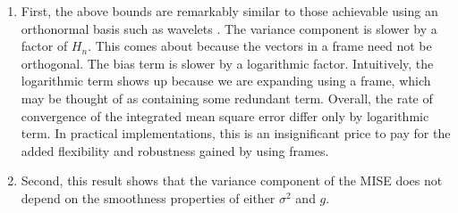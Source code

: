 \begin{remark}\mbox{}
  \begin{enumerate}  
    \item First, the above bounds are remarkably similar to those achievable using an orthonormal basis such as wavelets \citep{GenonCatalot1992}. The variance component is slower by a factor of $H_n$. This comes about because the vectors in a frame need not be orthogonal. The bias term is slower by a logarithmic factor. Intuitively, the logarithmic term shows up because we are expanding \sv using a frame, which may be thought of as containing some redundant term. Overall, the rate of convergence of the integrated mean square error differ only by logarithmic term. In practical implementations, this is an insignificant price to pay for the added flexibility and robustness gained by using frames. 
    \item Second, this result shows that the variance component of the MISE does not depend on the smoothness properties of either $\sigma^2$ and $g$.  
  \end{enumerate}
\end{remark}

